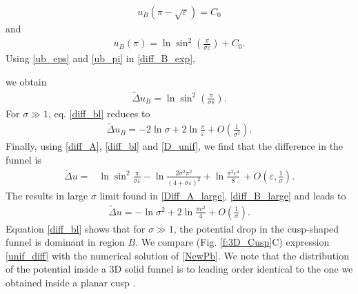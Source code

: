 \documentclass[12pt]{article}
\newcommand{\beq}{\begin{eqnarray}}
\newcommand{\eeq}{\end{eqnarray}}
\newcommand{\eps}{\varepsilon}
\begin{document}
\beq\label{ub_eps}
u_B(\pi-\sqrt{\eps})=C_0
\eeq
and
\beq\label{ub_pi}
u_B(\pi)=  \ln \sin^2\left(\frac{\pi}{\sigma\eps} \right) +C_0.
\eeq
Using \eqref{ub_eps} and \eqref{ub_pi} in \eqref{diff_B_exp}, {we obtain
\beq\label{diff_bl}
 \tilde\Delta u_{B}= \ln \sin^2 \left(\frac{\pi}{\sigma\eps} \right).
 \eeq
For $\sigma\gg1$, eq. \eqref{diff_bl} reduces to
 \beq\label{diff_B_large}
 \tilde\Delta u_{B}=-2\ln\sigma+2\ln\frac{ \pi}{\eps}+O\left(\frac{1}{\sigma^2}\right).
 \eeq
 Finally, using \eqref{diff_A}, \eqref{diff_bl} and \eqref{D_unif}, we find that the difference in the funnel is
 \begin{align}\label{unif_diff}
 \tilde\Delta u=&\ln\sin^2\frac{\pi }{\sigma\eps}-\ln\frac{2
 	\sigma^2\pi^2}{(4 +\sigma\eps)^2}+\ln\frac{\pi^2c^4}{8} \,+ O\left(\eps,\frac{1}{\sigma}\right).
 \end{align}
The results in large $\sigma$ limit found in \eqref{Diff_A_large}, \eqref{diff_B_large} and leads to
 \beq\label{diff_unif2}
 \tilde\Delta u=-\ln\sigma^2+2\ln\frac{\pi c^2 }{4}+O\left(\frac{1}{\sigma}\right).
 \eeq
 Equation \eqref{diff_bl} shows that for $\sigma\gg1$, the potential drop in the cusp-shaped funnel is dominant in region $B$. We compare (Fig. \ref{f:3D_Cusp}C) expression \eqref{unif_diff} with the numerical solution of \ref{NewPb}. We note that the distribution of the potential inside a 3D solid funnel is to leading order identical to the one we obtained inside a planar cusp \cite{NonLin2017}.

}
\end{document}
